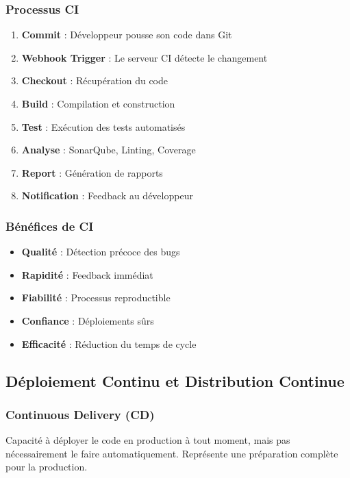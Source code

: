 \documentclass[12pt,a4paper]{report}
\begin{document}
\subsubsection{Processus CI}

\begin{enumerate}
    \item \textbf{Commit} : Développeur pousse son code dans Git
    \item \textbf{Webhook Trigger} : Le serveur CI détecte le changement
    \item \textbf{Checkout} : Récupération du code
    \item \textbf{Build} : Compilation et construction
    \item \textbf{Test} : Exécution des tests automatisés
    \item \textbf{Analyse} : SonarQube, Linting, Coverage
    \item \textbf{Report} : Génération de rapports
    \item \textbf{Notification} : Feedback au développeur
\end{enumerate}

\subsubsection{Bénéfices de CI}

\begin{itemize}
    \item \textbf{Qualité} : Détection précoce des bugs
    \item \textbf{Rapidité} : Feedback immédiat
    \item \textbf{Fiabilité} : Processus reproductible
    \item \textbf{Confiance} : Déploiements sûrs
    \item \textbf{Efficacité} : Réduction du temps de cycle
\end{itemize}

\subsection{Déploiement Continu et Distribution Continue}

\subsubsection{Continuous Delivery (CD)}

Capacité à déployer le code en production à tout moment, mais pas nécessairement le faire automatiquement. Représente une préparation complète pour la production.
\end{document}

